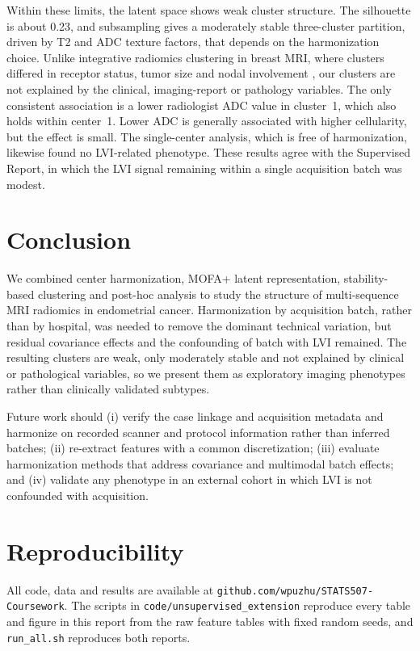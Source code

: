 \documentclass[conference]{IEEEtran}
\begin{document}
Within these limits, the latent space shows weak cluster structure. The silhouette is about 0.23, and subsampling gives a moderately stable three-cluster partition, driven by T2 and ADC texture factors, that depends on the harmonization choice. Unlike integrative radiomics clustering in breast MRI, where clusters differed in receptor status, tumor size and nodal involvement \cite{he2024integrative}, our clusters are not explained by the clinical, imaging-report or pathology variables. The only consistent association is a lower radiologist ADC value in cluster~1, which also holds within center~1. Lower ADC is generally associated with higher cellularity, but the effect is small. The single-center analysis, which is free of harmonization, likewise found no LVI-related phenotype. These results agree with the Supervised Report, in which the LVI signal remaining within a single acquisition batch was modest.

\section{Conclusion}

We combined center harmonization, MOFA+ latent representation, stability-based clustering and post-hoc analysis to study the structure of multi-sequence MRI radiomics in endometrial cancer. Harmonization by acquisition batch, rather than by hospital, was needed to remove the dominant technical variation, but residual covariance effects and the confounding of batch with LVI remained. The resulting clusters are weak, only moderately stable and not explained by clinical or pathological variables, so we present them as exploratory imaging phenotypes rather than clinically validated subtypes.

Future work should (i) verify the case linkage and acquisition metadata and harmonize on recorded scanner and protocol information rather than inferred batches; (ii) re-extract features with a common discretization; (iii) evaluate harmonization methods that address covariance and multimodal batch effects; and (iv) validate any phenotype in an external cohort in which LVI is not confounded with acquisition.

\section{Reproducibility}
All code, data and results are available at \texttt{github.com/wpuzhu/STATS507-Coursework}. The scripts in \texttt{code/unsupervised\_extension} reproduce every table and figure in this report from the raw feature tables with fixed random seeds, and \texttt{run\_all.sh} reproduces both reports.



\end{document}
